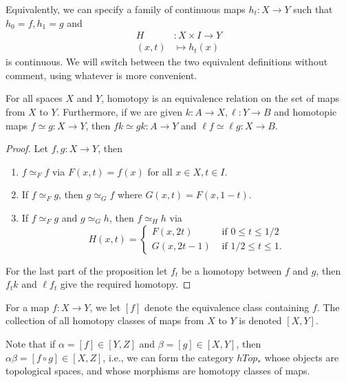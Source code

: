 \documentclass[ma3408.tex]{subfiles}
\begin{document}
\begin{Rem}
	Equivalently, we can specify a family of continuous maps $h_t \colon X \to Y$ such that $h_0 = f , h_1 = g$ and
\[
\begin{split}
H &\colon X \times I \to Y\\
 (x,t) &\mapsto h_t(x)
\end{split}
\]
is continuous. We will switch between the two equivalent definitions without comment, using whatever is more convenient. 
\end{Rem}
\begin{Prop}
For all spaces $X$ and $Y$, homotopy is an equivalence relation on the set of maps from $X$ to $Y$. Furthermore, if we are given $k \colon A \to X,\ell \colon Y \to B$ and homotopic maps $f \simeq g \colon X \to Y$, then $fk \simeq gk \colon A \to Y$ and $\ell f \simeq \ell g \colon X \to B$. 
\end{Prop}
\begin{proof}
Let $f,g \colon X \to Y$, then
\begin{enumerate}
	\item $f \simeq_F f$ via $F(x,t) = f(x)$ for all $x \in X,t \in I$. 
	\item If $f \simeq_F g$, then $g \simeq_G f$ where $G(x,t) = F(x,1-t)$. 
	\item If $f \simeq_F g$ and $g \simeq_G h$, then $f \simeq_H h$ via
	\[
H(x,t) = \begin{cases}
F(x,2t) & \text{ if } 0 \le t \le 1/2 \\
G(x,2t-1) & \text{ if } 1/2 \le t \le 1. 
\end{cases}
	\]
\end{enumerate}
For the last part of the proposition let $f_t$ be a homotopy between $f$ and $g$, then $f_tk$ and $\ell f_t$ give the required homotopy. 
\end{proof}
\begin{Def}
For a map $f \colon X \to Y$, we let $[f]$ denote the equivalence class containing $f$. The collection of all homotopy classes of maps from $X$ to $Y$ is denoted $[X,Y]$. 
\end{Def}
\begin{Rem}
Note that if $\alpha = [f] \in [Y,Z]$ and $\beta = [g] \in [X,Y]$, then $\alpha\beta = [f \circ g] \in [X,Z]$, i.e., we can form the category $hTop_*$ whose objects are topological spaces, and whose morphisms are homotopy classes of maps. 
\end{Rem}
\end{document}
